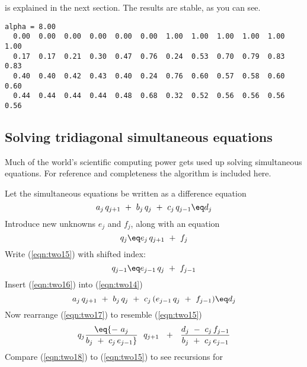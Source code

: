 is explained in the next section.
The results are stable, as you can see.
\begin{verbatim}
alpha = 8.00
  0.00  0.00  0.00  0.00  0.00  0.00  1.00  1.00  1.00  1.00  1.00  1.00
  0.17  0.17  0.21  0.30  0.47  0.76  0.24  0.53  0.70  0.79  0.83  0.83
  0.40  0.40  0.42  0.43  0.40  0.24  0.76  0.60  0.57  0.58  0.60  0.60
  0.44  0.44  0.44  0.44  0.48  0.68  0.32  0.52  0.56  0.56  0.56  0.56
\end{verbatim}
\begin{comment}
               \listing{heat/heatim.2tex}
\par
               \listing{heat/heatim.r}
\end{comment}
\subsection{Solving tridiagonal simultaneous equations}
\par
Much of the world's scientific computing power gets used up solving
 simultaneous equations.
For reference and completeness the algorithm is included here.
\par
Let the simultaneous equations be written as a difference
equation 
\begin{equation}
a_j \, q_{j+1} \ +\  b_j \, q_j \ +\  c_j \, q_{j-1}
 \eq d_j
\label{eqn:two14}
\end{equation}
Introduce new unknowns  $e_j$  and  $f_j$,  
along with an equation
\begin{equation}
q_j  \eq  e_j \, q_{j+1} \ +\  f_j
\label{eqn:two15}
\end{equation}
Write (\ref{eqn:two15}) with shifted index:
\begin{equation}
q_{j-1}  \eq  e_{j-1} \, q_j \ +\ f_{j-1} 
\label{eqn:two16}
\end{equation}
Insert (\ref{eqn:two16}) into (\ref{eqn:two14})
\begin{equation}
a_j \, q_{j+1} \ +\  b_j \, q_j \ +\ 
c_j \, ( e_{j-1} \, q_j \ +\  f_{j-1} )  \eq  d_j
\label{eqn:two17}
\end{equation}
Now rearrange (\ref{eqn:two17}) to resemble (\ref{eqn:two15})
\begin{equation}
q_j  \eq 
{ - \  a_j   \over  b_j \ +\  c_j \, e_{j-1} } \ \  q_{j+1}
   \ \ +\ \  { d_j \ -\  c_j \, f_{j-1}   \over  b_j \ +\  c_j \, e_{j-1} }
\label{eqn:two18}
\end{equation}
Compare (\ref{eqn:two18}) to (\ref{eqn:two15}) to see recursions for
